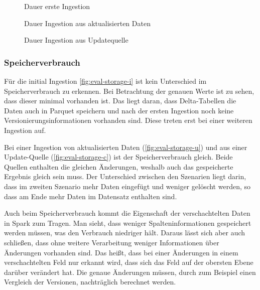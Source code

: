\begin{figure}
    \centering
    \caption{Dauer erste Ingestion}
    
    \label{fig:eval-time-i}
\end{figure}

\begin{figure}
    \centering
    \caption{Dauer Ingestion aus aktualisierten Daten}
    
    \label{fig:eval-time-u}
\end{figure}

\begin{figure}
    \centering
    \caption{Dauer Ingestion aus Updatequelle}
    
    \label{fig:eval-time-c}
\end{figure}

\subsubsection{Speicherverbrauch}

Für die initial Ingestion \cref{fig:eval-storage-i} ist kein Unterschied im Speicherverbrauch zu erkennen.
Bei Betrachtung der genauen Werte ist zu sehen, dass dieser minimal vorhanden ist.
Das liegt daran, dass Delta-Tabellen die Daten auch in Parquet speichern und nach der ersten Ingestion noch keine Versionierungsinformationen vorhanden sind.
Diese treten erst bei einer weiteren Ingestion auf.

Bei einer Ingestion von aktualisierten Daten (\cref{fig:eval-storage-u}) und aus einer Update-Quelle (\cref{fig:eval-storage-c}) ist der Speicherverbrauch gleich.
Beide Quellen enthalten die gleichen Änderungen, weshalb auch das gespeicherte Ergebnis gleich sein muss.
Der Unterschied zwischen den Szenarien liegt darin, dass im zweiten Szenario mehr Daten eingefügt und weniger gelöscht werden, so dass am Ende mehr Daten im Datensatz enthalten sind.

Auch beim Speicherverbrauch kommt die Eigenschaft der verschachtelten Daten in Spark zum Tragen.
Man sieht, dass weniger Spalteninformationen gespeichert werden müssen, was den Verbrauch niedriger hält.
Daraus lässt sich aber auch schließen, dass ohne weitere Verarbeitung weniger Informationen über Änderungen vorhanden sind.
Das heißt, dass bei einer Änderungen in einem verschachtelten Feld nur erkannt wird, dass sich das Feld auf der obersten Ebene darüber verändert hat.
Die genaue Änderungen müssen, durch zum Beispiel einen Vergleich der Versionen, nachträglich berechnet werden.


